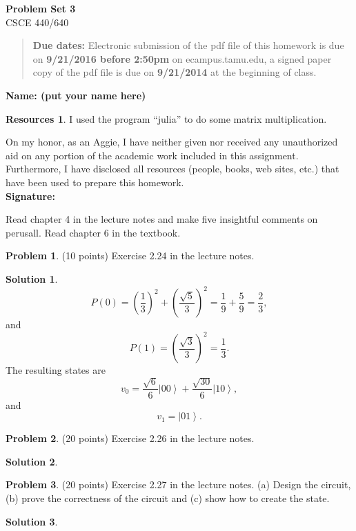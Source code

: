 \documentclass{article}
\theoremstyle{definition}
\newtheorem{problem}{Problem}
\newtheorem*{solution}{Solution}
\newtheorem*{resources}{Resources}
\newcommand{\name}[1]{\noindent\textbf{Name: #1}}
\newcommand{\honor}{\noindent On my honor, as an Aggie, I have neither
  given nor received any unauthorized aid on any portion of the
  academic work included in this assignment. Furthermore, I have
  disclosed all resources (people, books, web sites, etc.) that have
  been used to prepare this homework. \\[1ex]
 \textbf{Signature:} \underline{\hspace*{5cm}} }
\newcommand{\problemset}[1]{\begin{center}\textbf{Problem Set #1}\\ 
CSCE 440/640\end{center}}
\newcommand{\duedate}[2]{\begin{quote}\textbf{Due dates:} Electronic
    submission of the pdf file of this homework is due on \textbf{#1} on ecampus.tamu.edu, a signed paper copy
    of the pdf file is due on \textbf{#2} at the beginning of
    class. \end{quote} }
\begin{document}
\problemset{3}
\duedate{9/21/2016 before 2:50pm}{9/21/2014}
\name{ (put your name here)}
\begin{resources} I used the program ``julia'' to do some matrix multiplication.
\end{resources}
\honor

\newpage

\noindent Read chapter 4 in the lecture notes and make five insightful
comments on perusall. Read chapter 6 in the textbook. \medskip


\begin{problem}(10 points) 
Exercise 2.24 in the lecture notes. 
\end{problem}
\begin{solution}
$$P(0) = \left(\frac{1}{3}\right)^2 + \left(\frac{\sqrt 5}{3}\right)^2 =  \frac{1}{9} + \frac{5}{9} = \frac{2}{3},$$
and
$$P(1) = \left(\frac{\sqrt 3}{3}\right)^2 = \frac{1}{3}.$$
The resulting states are
$$v_0 = \frac{\sqrt 6}{6} \left| 00 \right\rangle + \frac{\sqrt{30}}{6} \left| 10 \right\rangle,$$
and
$$v_1 = \left| 01 \right\rangle.$$
\end{solution}

\begin{problem}(20 points) 
Exercise 2.26 in the lecture notes. 
\end{problem}
\begin{solution}


\end{solution}

\begin{problem}(20 points)
Exercise 2.27 in the lecture notes. (a) Design the circuit, 
(b) prove the correctness of the
circuit and (c) show how to create the state. 
\end{problem}
\begin{solution}

\end{solution}
\end{document}
